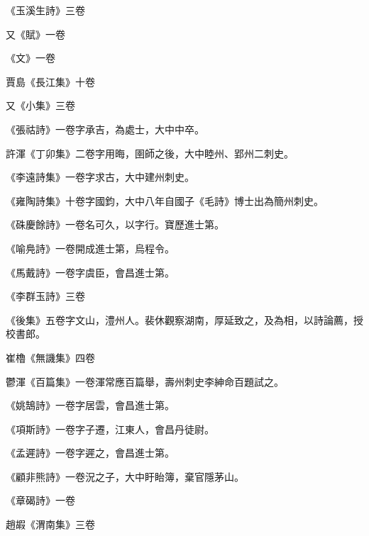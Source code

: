 \begin{pinyinscope}
 《玉溪生詩》三卷



 又《賦》一卷



 《文》一卷



 賈島《長江集》十卷



 又《小集》三卷



 《張祜詩》一卷字承吉，為處士，大中中卒。



 許渾《丁卯集》二卷字用晦，圉師之後，大中睦州、郢州二刺史。



 《李遠詩集》一卷字求古，大中建州刺史。



 《雍陶詩集》十卷字國鈞，大中八年自國子《毛詩》博士出為簡州刺史。



 《硃慶餘詩》一卷名可久，以字行。寶歷進士第。



 《喻鳧詩》一卷開成進士第，烏程令。



 《馬戴詩》一卷字虞臣，會昌進士第。



 《李群玉詩》三卷



 《後集》五卷字文山，澧州人。裴休觀察湖南，厚延致之，及為相，以詩論薦，授校書郎。



 崔櫓《無譏集》四卷



 鬱渾《百篇集》一卷渾常應百篇舉，壽州刺史李紳命百題試之。



 《姚鵠詩》一卷字居雲，會昌進士第。



 《項斯詩》一卷字子遷，江東人，會昌丹徒尉。



 《孟遲詩》一卷字遲之，會昌進士第。



 《顧非熊詩》一卷況之子，大中盱眙簿，棄官隱茅山。



 《章碣詩》一卷



 趙嘏《渭南集》三卷




\end{pinyinscope}
